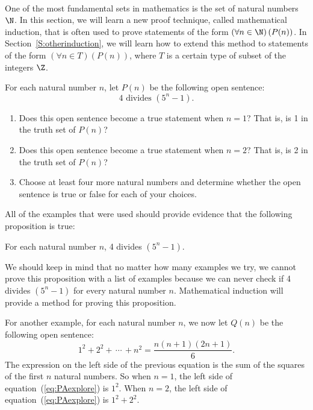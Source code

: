 \begin{previewactivity} \label{PA:exploringstatements} \hfill \\
One of the most fundamental sets in mathematics is the set of natural numbers $\N$.  In this section, we will learn a new proof technique, called mathematical induction, that is often used to prove statements of the form 
$\left( \forall n \in \N \right)\left( P(n) \right)$.  In Section~\ref{S:otherinduction}, we will learn how to extend this method to statements of the form $\left( \forall n \in T \right)\left( P(n) \right)$, where $T$ is a certain type of subset of the integers $\Z$.

\newpar
For each natural number $n$, let $P(n)$ be the following open sentence:
\[
4 \text{ divides }  \left( {5^n  - 1} \right)\!.
\]
\begin{enumerate}
\item Does this open sentence become a true statement when  $n = 1$?  That is, is  1  in the truth set of $P(n)$?

\item Does this open sentence become a true statement when  $n = 2$?  That is, is  2  in the truth set of $P(n)$?

\item Choose at least four more natural numbers and determine whether the open sentence is true or false for each of your choices.
\end{enumerate}
All of the examples that were used should provide evidence that the following proposition is true:
\begin{center}
For each natural number  $n$, 4  divides  $\left( {5^n  - 1} \right)$.
\end{center}
We should keep in mind that no matter how many examples we try, we cannot prove this proposition with a list of examples because we can never check if 4 divides $\left( {5^n  - 1} \right)$ for every natural number $n$.  Mathematical induction will provide a method for proving this proposition.

\setcounter{equation}{0}
For another example, for each natural number $n$, we now let $Q( n )$ be the following open sentence:
\begin{equation} \label{eq:PAexplore}
1^2  + 2^2  + \, \cdots \, + n^2  = \frac{{n(n + 1)(2n + 1)}}{6}.
\end{equation}
The expression on the left side of the previous equation is the sum of the squares of the first  $n$  natural numbers.  So when  $n = 1$, the left side of equation~(\ref{eq:PAexplore}) is  
$1^2 $.  When  $n = 2$, the left side of equation~(\ref{eq:PAexplore}) is  $1^2  + 2^2 $.


\end{previewactivity}
